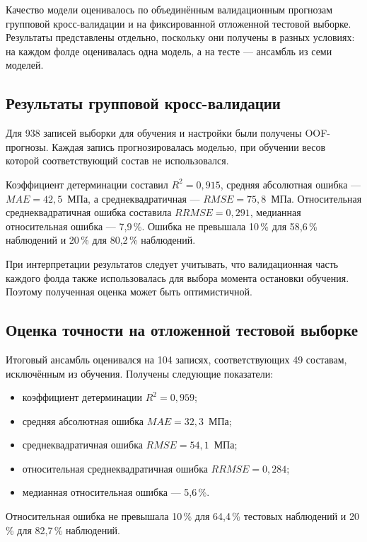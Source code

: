 Качество модели оценивалось по объединённым
валидационным прогнозам групповой кросс-валидации
и на фиксированной отложенной тестовой выборке.
Результаты представлены отдельно, поскольку
они получены в разных условиях: на каждом
фолде оценивалась одна модель, а на тесте ---
ансамбль из семи моделей.

\subsection{Результаты групповой кросс-валидации}

Для 938 записей выборки для обучения и настройки
были получены OOF-прогнозы. Каждая запись
прогнозировалась моделью, при обучении весов
которой соответствующий состав не использовался.

Коэффициент детерминации составил $R^2=0{,}915$,
средняя абсолютная ошибка --- $MAE=42{,}5$~МПа,
а среднеквадратичная --- $RMSE=75{,}8$~МПа.
Относительная среднеквадратичная ошибка
составила $RRMSE=0{,}291$,
медианная относительная ошибка --- 7,9\,\%.
Ошибка не превышала 10\,\% для 58,6\,\%
наблюдений и 20\,\% для 80,2\,\% наблюдений.

При интерпретации результатов следует учитывать,
что валидационная часть каждого фолда также
использовалась для выбора момента остановки
обучения. Поэтому полученная оценка может
быть оптимистичной.

\subsection{Оценка точности на отложенной тестовой выборке}

Итоговый ансамбль оценивался на 104 записях,
соответствующих 49 составам,
исключённым из обучения.
Получены следующие показатели:
\begin{itemize}
    \item коэффициент детерминации
    $R^2=0{,}959$;
    \item средняя абсолютная ошибка
    $MAE=32{,}3$~МПа;
    \item среднеквадратичная ошибка
    $RMSE=54{,}1$~МПа;
    \item относительная среднеквадратичная ошибка
    $RRMSE=0{,}284$;
    \item медианная относительная ошибка ---
    5,6\,\%.
\end{itemize}

Относительная ошибка не превышала 10\,\%
для 64,4\,\% тестовых наблюдений
и 20\,\% для 82,7\,\% наблюдений.

